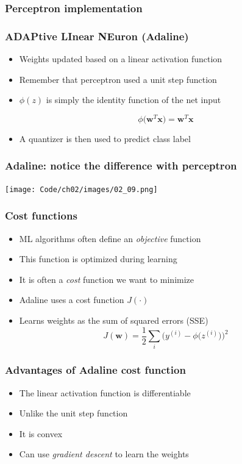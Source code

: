 \documentclass{beamer}
\begin{document}
\begin{frame}
  \frametitle{Perceptron implementation}
  \href{https://github.com/rasbt/python-machine-learning-book/blob/master/code/ch02/ch02.ipynb}{}
\end{frame}

\begin{frame}
  \frametitle{ADAPtive LInear NEuron (Adaline)}
  \begin{itemize}
  \item Weights updated based on a linear activation function
  \item Remember that perceptron used a unit step function
  \item  $\phi(z)$ is simply the identity function of the net input

    \[
    \phi \big( \mathbf{w}^T \mathbf{x} \big) = \mathbf{w}^T \mathbf{x}
    \]

    \item A quantizer is then used to predict class label
  \end{itemize}
\end{frame}

\begin{frame}
  \frametitle{Adaline: notice the difference with perceptron}
  \texttt{[image: Code/ch02/images/02\_09.png]}
\end{frame}

\begin{frame}
  \frametitle{Cost functions}
  \begin{itemize}
  \item ML algorithms often define an \emph{objective} function
  \item This function is optimized during learning
  \item It is often a \emph{cost} function we want to minimize
  \item Adaline uses a cost function $J(\cdot)$
  \item Learns weights as the sum of squared errors (SSE)
    \[
    J(\mathbf{w}) = \frac{1}{2} \sum_i \bigg(y^{(i)}  - \phi \big(z^{(i)} \big) \bigg)^2
    \]
  \end{itemize}
\end{frame}

\begin{frame}
  \frametitle{Advantages of Adaline cost function}
  \begin{itemize}
  \item The linear activation function is differentiable
  \item Unlike the unit step function
  \item It is convex
  \item Can use \emph{gradient descent} to learn the weights
  \end{itemize}
\end{frame}
\end{document}
